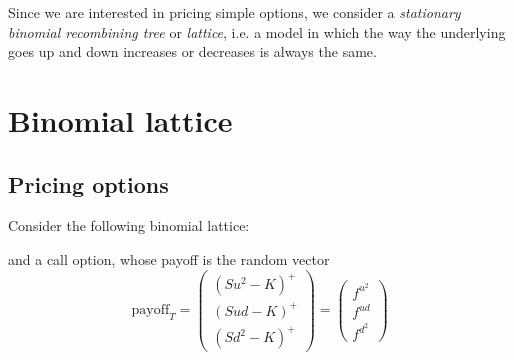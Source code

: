 \noindent Since we are interested in pricing simple options, we consider a \emph{stationary binomial recombining tree} or \emph{lattice}, i.e. a model in which the way the underlying goes up and down increases or decreases is always the same.

\section{Binomial lattice}
\subsection{Pricing options}
Consider the following binomial lattice:
\begin{center}
\end{center}
and a call option, whose payoff is the random vector
\begin{equation*}
    \mbox{payoff}_T = \left(
    \begin{matrix}
        (Su^2-K)^+ \\ (Sud-K)^+ \\ (Sd^2-K)^+
    \end{matrix}
    \right) 
    =
    \left(
    \begin{matrix}
        f^{u^2} \\ f^{ud} \\ f^{d^2}
    \end{matrix}
    \right) 
\end{equation*}

